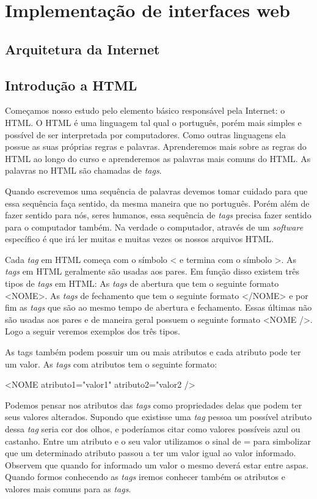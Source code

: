 \section{Implementação de interfaces web}

\subsection{Arquitetura da Internet}

\subsection{Introdução a HTML}
Começamos nosso estudo pelo elemento básico responsável pela Internet: o HTML. O HTML é uma linguagem tal qual o português, porém mais simples e possível de ser interpretada por computadores. Como outras linguagens ela possue as suas próprias regras e palavras. Aprenderemos mais sobre as regras do HTML ao longo do curso e aprenderemos as palavras mais comuns do HTML. As palavras no HTML são chamadas de \textit{tags}.

Quando escrevemos uma sequência de palavras devemos tomar cuidado para que essa sequência faça sentido, da mesma maneira que no português. Porém além de fazer sentido para nós, seres humanos, essa sequência de \textit{tags} precisa fazer sentido para o computador também. Na verdade o computador, através de um \textit{software} específico é que irá ler muitas e muitas vezes os nossos arquivos HTML.

Cada \textit{tag} em HTML começa com o símbolo < e termina com o símbolo >. As \textit{tags} em HTML geralmente são usadas aos pares. Em função disso existem três tipos de \textit{tags} em HTML:
As \textit{tags} de abertura que tem o seguinte formato <NOME>.
As \textit{tags} de fechamento que tem o seguinte formato </NOME> e por fim as \textit{tags} que são ao mesmo tempo de abertura e fechamento. Essas últimas não são usadas aos pares e de maneira geral possuem o seguinte formato <NOME />. Logo a seguir veremos exemplos dos três tipos.

As tags também podem possuir um ou mais atributos e cada atributo pode ter um valor. As \textit{tags} com atributos tem o seguinte formato:

<NOME atributo1="valor1" atributo2="valor2 />

Podemos pensar nos atributos das \textit{tags} como propriedades delas que podem ter seus valores alterados. Supondo que existisse uma \textit{tag} pessoa um possível atributo dessa \textit{tag} seria cor dos olhos, e poderíamos citar como valores possíveis azul ou castanho. Entre um atributo e o seu valor utilizamos o sinal de = para simbolizar que um determinado atributo passou a ter um valor igual ao valor informado. Observem que quando for informado um valor o mesmo deverá estar entre aspas. Quando formos conhecendo as \textit{tags} iremos conhecer também os atributos e valores mais comuns para as \textit{tags}.

